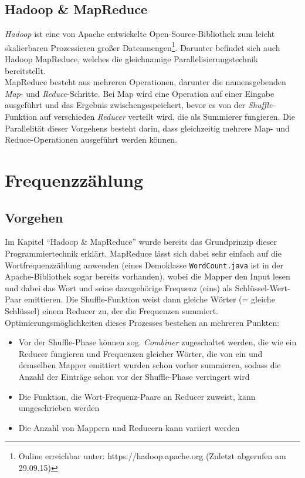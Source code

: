 \documentclass[a4paper,12pt]{scrartcl}
\begin{document}
    \subsection{Hadoop \& MapReduce}

    \emph{Hadoop} ist eine von Apache entwickelte Open-Source-Bibliothek zum leicht skalierbaren Prozessieren großer Datenmengen\footnote{Online erreichbar unter: https://hadoop.apache.org (Zuletzt abgerufen am 29.09.15)}. Darunter befindet sich auch Hadoop MapReduce, welches die gleichnamige Parallelisierungstechnik bereitstellt. \\
    MapReduce besteht aus mehreren Operationen, darunter die namensgebenden \emph{Map}- und \emph{Reduce}-Schritte. Bei Map wird eine Operation auf einer Eingabe ausgeführt und das Ergebnis zwischengespeichert, bevor es von der \emph{Shuffle}-Funktion auf verschieden \emph{Reducer} verteilt wird, die als Summierer fungieren. Die Parallelität dieser Vorgehens besteht darin, dass gleichzeitig mehrere Map- und Reduce-Operationen ausgeführt werden können. 

\section{Frequenzzählung}

    \subsection{Vorgehen}

    Im Kapitel ``Hadoop \& MapReduce'' wurde bereits das Grundprinzip dieser Programmiertechnik erklärt. MapReduce lässt sich dabei sehr einfach auf die Wortfrequenzzählung anwenden (eines Demoklasse {\tt WordCount.java} ist in der Apache-Bibliothek sogar bereits vorhanden), wobei die Mapper den Input lesen und dabei das Wort und seine dazugehörige Frequenz (eins) als Schlüssel-Wert-Paar emittieren. Die Shuffle-Funktion weist dann gleiche Wörter (= gleiche Schlüssel) einem Reducer zu, der die Frequenzen summiert. \\

    Optimierungsmöglichkeiten dieses Prozesses bestehen an mehreren Punkten:
    \begin{itemize}
        \item Vor der Shuffle-Phase können sog. \emph{Combiner} zugeschaltet werden, die wie ein Reducer fungieren und Frequenzen gleicher Wörter, die von ein und demselben Mapper emittiert wurden schon vorher summieren, sodass die Anzahl der Einträge schon vor der Shuffle-Phase verringert wird
        \item Die Funktion, die Wort-Frequenz-Paare an Reducer zuweist, kann umgeschrieben werden
        \item Die Anzahl von Mappern und Reducern kann variiert werden
    \end{itemize}
\end{document}

